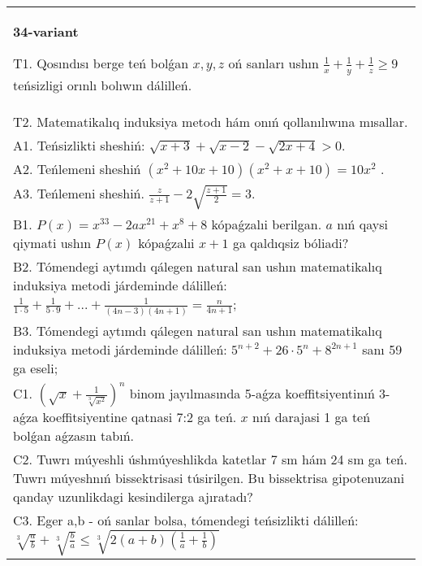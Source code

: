 \documentclass{article}
\begin{document}
\begin{tabular}{m{17cm}}
\textbf{34-variant}
\newline

T1. Qosındısı berge teń bolǵan \(x,y,z\) oń sanları ushın \(\frac{1}{x} + \frac{1}{y} + \frac{1}{z} \geq 9\) teńsizligi orınlı bolıwın dálilleń. \\
T2. Matematikalıq induksiya metodı hám onıń qollanılıwına mısallar. \\
A1. Teńsizlikti sheshiń: \(\sqrt{x + 3} + \sqrt{x - 2} - \sqrt{2x + 4} > 0\). \\
A2. Teńlemeni sheshiń \(\left( x^{2} + 10x + 10 \right)\left( x^{2} + x + 10 \right) = 10x^{2}\) . \\
A3. Teńlemeni sheshiń. \(\frac{z}{z + 1} - 2\sqrt{\frac{z + 1}{2}} = 3\). \\
B1. \(P(x) = x^{33} - 2ax^{21} + x^{8} + 8\) kópaǵzalıi berilgan. \(a\) nıń qaysi qiymati ushın \(P(x)\) kópaǵzalıi \(x + 1\) ga qaldıqsiz bóliadi? \\
B2. Tómendegi aytımdı qálegen natural san ushın matematikalıq induksiya metodi járdeminde dálilleń: \(\frac{1}{1 \cdot 5} + \frac{1}{5 \cdot 9} + ... + \frac{1}{(4n - 3)(4n + 1)} = \frac{n}{4n + 1}\); \\
B3. Tómendegi aytımdı qálegen natural san ushın matematikalıq induksiya metodi járdeminde dálilleń: \(5^{n + 2} + 26 \cdot 5^{n} + 8^{2n + 1}\) sanı 59 ga eseli; \\
C1. \(\left( \sqrt{x} + \frac{1}{\sqrt[3]{x^{2}}} \right)^{n}\) binom jayılmasında 5-aǵza koeffitsiyentinıń 3-aǵza koeffitsiyentine qatnasi 7:2 ga teń. \(x\) nıń darajasi 1 ga teń bolǵan aǵzasın tabıń. \\
C2. Tuwrı múyeshli úshmúyeshlikda katetlar 7 sm hám 24 sm ga teń. Tuwrı múyeshnıń bissektrisasi túsirilgen. Bu bissektrisa gipotenuzani qanday uzunlikdagi kesindilerga ajıratadı? \\
C3. Eger a,b - oń sanlar bolsa, tómendegi teńsizlikti dálilleń: \(\sqrt[3]{\frac{a}{b}} + \sqrt[3]{\frac{b}{a}} \leq \sqrt[3]{2(a + b)\left( \frac{1}{a} + \frac{1}{b} \right)}\) \\

\end{tabular}
\vspace{1cm}
\end{document}
